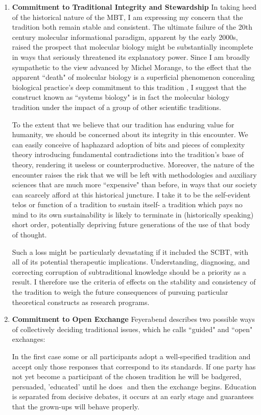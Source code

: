 \begin{enumerate}
\item \textbf{Commitment to Traditional Integrity and Stewardship}
\label{stability}
In taking heed of the historical nature of the MBT, I am expressing my concern that the tradition both remain stable and consistent. The ultimate failure of the 20th century molecular informational paradigm, apparent by the early 2000s, raised the prospect that molecular biology might be substantially incomplete in ways that seriously threatened its explanatory power. Since I am broadly sympathetic to the view advanced by Michel Morange, to the effect that the apparent ``death" of molecular biology is a superficial phenomenon concealing biological practice's deep commitment to this tradition \cite{Morange2008}, I suggest that the construct known as ``systems biology" is in fact the molecular biology tradition under the impact of a group of other scientific traditions.

 To the extent that we believe that our tradition has enduring value for humanity, we should be concerned about its integrity in this encounter. We can easily conceive of haphazard adoption of bits and pieces of complexity theory introducing fundamental contradictions into the tradition's base of theory, rendering it useless or counterproductive. Moreover, the nature of the encounter raises the risk that we will be left with methodologies and auxiliary sciences that are much more ``expensive" than before, in ways that our society can scarcely afford at this historical juncture. I take it to be the self-evident telos or function of a tradition to sustain itself- a tradition which pays no mind to its own sustainability is likely to terminate in (historically speaking) short order, potentially depriving future generations of the use of that body of thought. 
 
 Such a loss might be particularly devastating if it included the SCBT, with all of its potential therapeutic implications. Understanding, diagnosing, and correcting corruption of subtraditional knowledge should be a priority as a result. I therefore use the criteria of effects on the stability and consistency of the tradition to weigh the future consequences of pursuing particular theoretical constructs as research programs.

\item \textbf{Commitment to Open Exchange}
\label{open}
Feyerabend describes two possible ways of collectively deciding traditional issues, which he calls ``guided" and ``open" exchanges:

\begin{longquote}
In the first case some or all participants adopt a well-specified
tradition and accept only those responses that correspond to its
standards. If one party has not yet become a participant of the chosen
tradition he will be badgered, persuaded, 'educated' until he does ­
and then the exchange begins. Education is separated from decisive
debates, it occurs at an early stage and guarantees that the grown-ups
will behave properly.


\end{longquote}
\end{enumerate}
